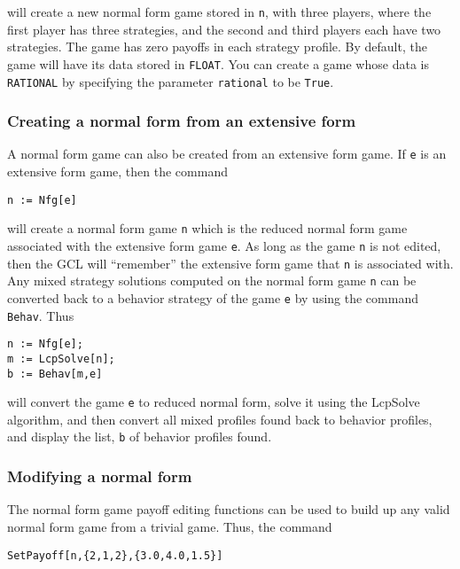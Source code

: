 \noindent 
will create a new normal form game stored in \verb+n+, with three players, where
the first player has three strategies, and the second and third
players each have two strategies.  The game has zero payoffs in each
strategy profile.  By default, the game will have its data stored in
\verb+FLOAT+.  You can create a game whose data is \verb+RATIONAL+
by specifying the parameter \verb+rational+ to be \verb+True+.

\subsubsection{Creating a normal form from an extensive form}

A normal form game can also be created from an extensive form game.
If \verb+e+ is an extensive form game, then the command 

\begin{verbatim}
n := Nfg[e]
\end{verbatim}

\noindent
will create a normal form game \verb+n+ which is the reduced normal
form game associated with the extensive form game \verb+e+.  As long
as the game \verb+n+ is not edited, then the GCL will ``remember'' the
extensive form game that \verb+n+ is associated with.  Any mixed
strategy solutions computed on the normal form game \verb+n+ can be
converted back to a behavior strategy of the game \verb+e+ by using
the command \verb+Behav+.  Thus

\begin{verbatim}
n := Nfg[e];
m := LcpSolve[n];
b := Behav[m,e]
\end{verbatim}

\noindent
will convert the game \verb+e+ to reduced normal form, solve it using
the LcpSolve algorithm, and then convert all mixed profiles found back
to behavior profiles, and display the list, \verb+b+ of behavior
profiles found. 
  
\subsubsection{Modifying a normal form}

The normal form game payoff editing functions can be used to build up any
valid normal form game from a trivial game.  Thus, the command

\begin{verbatim}
SetPayoff[n,{2,1,2},{3.0,4.0,1.5}]
\end{verbatim}

